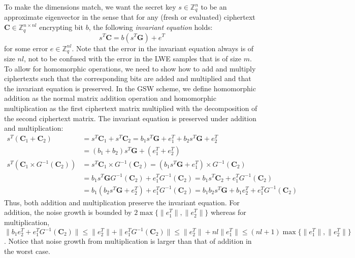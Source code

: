 To make the dimensions match, we want the secret key $s \in \mathbb{Z}_q^n$ to be an approximate eigenvector in the sense that for any (fresh or evaluated) ciphertext $\textbf{C} \in \mathbb{Z}_q^{n \times nl}$ encrypting bit $b$, the following \emph{invariant equation} holds:
\begin{equation*}
    s^T \textbf{C} = b(s^T\textbf{G}) + e^T 
\end{equation*}
for some error $e \in \mathbb{Z}_q^{nl}$. Note that the error in the invariant equation always is of size $nl$, not to be confused with the error in the LWE samples that is of size $m$. To allow for homomorphic operations, we need to show how to add and multiply ciphertexts such that the corresponding bits are added and multiplied and that the invariant equation is preserved. In the GSW scheme, we define homomorphic addition as the normal matrix addition operation and homomorphic multiplication as the first ciphertext matrix multiplied with the decomposition of the second ciphertext matrix. The invariant equation is preserved under addition and multiplication:
\begin{equation*}
    \begin{aligned}
    s^T (\textbf{C}_1 + \textbf{C}_2) &= s^T\textbf{C}_1 + s^T\textbf{C}_2 = b_1s^T\textbf{G} + e_1^T + b_2s^T\textbf{G} + e_2^T \\
    &= (b_1 + b_2)s^T\textbf{G} + (e_1^T + e_2^T)\\
    s^T (\textbf{C}_1 \times G^{-1}(\textbf{C}_2)) &= s^T\textbf{C}_1 \times G^{-1}(\textbf{C}_2) = (b_1s^T\textbf{G} + e_1^T) \times G^{-1}(\textbf{C}_2) \\
    &= b_1s^T\textbf{G}G^{-1}(\textbf{C}_2) + e_1^TG^{-1}(\textbf{C}_2) = b_1s^T\textbf{C}_2 + e_1^TG^{-1}(\textbf{C}_2) \\
    &= b_1(b_2s^T\textbf{G} + e_2^T) + e_1^TG^{-1}(\textbf{C}_2) = b_1b_2s^T\textbf{G} + b_1e_2^T + e_1^TG^{-1}(\textbf{C}_2)
    \end{aligned}
\end{equation*}
Thus, both addition and multiplication preserve the invariant equation. For addition, the noise growth is bounded by $2\max\{\|e_1^T\|,\|e_2^T\|\}$ whereas for multiplication, $\| b_1e_2^T + e_1^TG^{-1}(\textbf{C}_2) \| \leq \|e_2^T\| + \|e_1^TG^{-1}(\textbf{C}_2)\| \leq \|e_2^T\| + nl\|e_1^T\| \leq (nl + 1) \max\{\|e_1^T\|,\|e_2^T\|\}$. Notice that noise growth from multiplication is larger than that of addition in the worst case.

